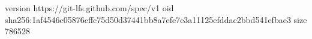 version https://git-lfs.github.com/spec/v1
oid sha256:1af4546c05876cffc75d50d37441bb8a7efe7e3a11125efddac2bbd541efbae3
size 786528
